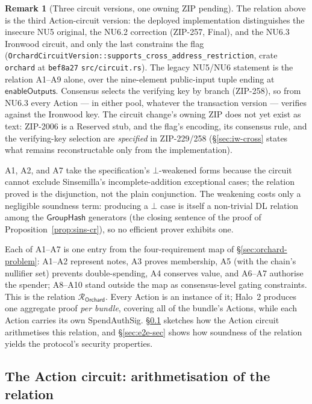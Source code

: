 \documentclass[11pt,a4paper]{article}
\theoremstyle{definition}
\newtheorem{remark}[theorem]{Remark}
\newcommand{\Rel}{\mathcal{R}}
\newcommand{\GroupHash}{\ensuremath{\mathsf{GroupHash}}}
\begin{document}
\begin{remark}[Three circuit versions, one owning ZIP
pending]\label{rem:action-versions}
The relation above is the third Action-circuit version: the deployed
implementation distinguishes the insecure NU5 original, the NU6.2
correction (ZIP-257, Final), and the NU6.3 Ironwood circuit, and only the
last constrains the flag
(\texttt{OrchardCircuitVersion::supports\_cross\_address\_restriction},
crate \texttt{orchard} at \texttt{bef8a27} \texttt{src/circuit.rs}). The legacy NU5/NU6
statement is the relation A1--A9 alone, over the nine-element public-input
tuple ending at $\mathsf{enableOutputs}$. Consensus selects the verifying
key by branch (ZIP-258), so from NU6.3 every Action --- in either
pool, whatever the transaction version --- verifies against the Ironwood
key. The circuit change's owning ZIP does not yet exist as text: ZIP-2006
is a Reserved stub, and the flag's encoding, its consensus rule, and the
verifying-key selection are \emph{specified} in ZIP-229/258
(\S\ref{sec:iw-cross} states what remains reconstructable only from the
implementation).
\end{remark}

A1, A2, and A7 take the specification's $\bot$-weakened forms because the
circuit cannot exclude Sinsemilla's incomplete-addition exceptional cases;
the relation proved is the disjunction, not the plain conjunction. The
weakening costs only a negligible soundness term: producing a $\bot$ case
is itself a non-trivial DL relation among the $\GroupHash$ generators (the
closing sentence of the proof of Proposition~\ref{prop:sins-cr}), so no
efficient prover exhibits one.

Each of A1--A7 is one entry from the four-requirement map of
\S\ref{sec:orchard-problem}: A1--A2 represent notes, A3 proves membership,
A5 (with the chain's nullifier set) prevents double-spending, A4 conserves
value, and A6--A7 authorise the spender; A8--A10 stand outside the map as
consensus-level gating constraints. This is the relation
$\Rel_{\mathsf{Orchard}}$. Every Action is an instance of it; Halo~2
produces one aggregate proof \emph{per bundle}, covering all of the
bundle's Actions, while each Action carries its own SpendAuthSig.
\S\ref{sec:circuit} sketches how the Action circuit arithmetises this relation,
and \S\ref{sec:e2e-sec} shows how soundness of the relation yields the
protocol's security properties.
\subsection{The Action circuit: arithmetisation of the relation}\label{sec:circuit}
\end{document}
